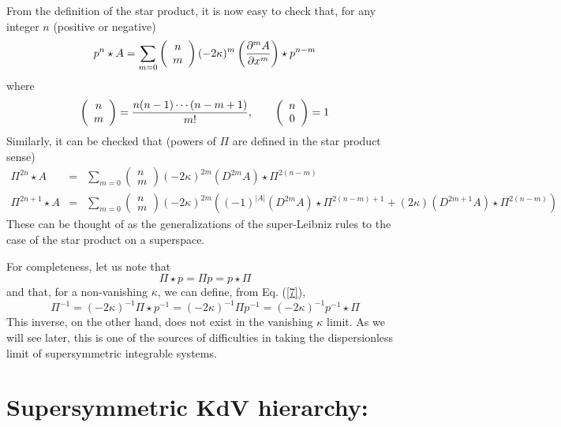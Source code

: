 \documentclass[a4paper,11pt]{article}
\begin{document}
From the definition of the star product, it is now easy to check that,
for any integer $n$ (positive or negative)
\begin{equation}
p^{n}\star A = \sum_{m=0} \left(\begin{array}{c} n\\
m\end{array}\right) (-2\kappa)^{m}\left({\partial^{m}A\over \partial
x^{m}}\right) \star p^{n-m}\label{8}
\end{equation}
where
\[
\left(\begin{array}{c} n\\ m\end{array}\right) = {n(n-1)\cdots
(n-m+1)\over m!},\qquad \left(\begin{array}{c} n\\ 0\end{array}\right)
= 1
\]
Similarly, it can be checked that (powers of $\Pi$ are defined in the star
product sense)
\begin{eqnarray}
\Pi^{2n}\star A & = & \sum_{m=0} \left(\begin{array}{c} n\\
m\end{array}\right) (-2\kappa)^{2m} (D^{2m}A)\star
\Pi^{2(n-m)}\label{9}\\
\Pi^{2n+1}\star A & = & \sum_{m=0} \left(\begin{array}{c} n\\
m\end{array}\right) (-2\kappa)^{2m}\left((-1)^{|A|}(D^{2m}A)\star
\Pi^{2(n-m)+1} + (2\kappa) (D^{2m+1}A)\star
\Pi^{2(n-m)}\right)\nonumber
\end{eqnarray}
These can be thought of as the generalizations of the super-Leibniz
rules \cite{5} to the case of the star product on a superspace.

For completeness, let us note that
\[
\Pi\star p = \Pi p = p\star \Pi 
\]
and that, for a non-vanishing $\kappa$, we can define, from Eq. (\ref{7}),
\begin{equation}
\Pi^{-1} = (-2\kappa)^{-1} \Pi\star p^{-1} = (-2\kappa)^{-1}\Pi p^{-1}
= (-2\kappa)^{-1} p^{-1}\star \Pi\label{10}
\end{equation}
This inverse, on the other hand, does not exist in the vanishing $\kappa$
limit. As we will see later, this is one of the sources of
difficulties in taking the dispersionless limit of supersymmetric
integrable systems.

\section{Supersymmetric KdV hierarchy:}
\end{document}
